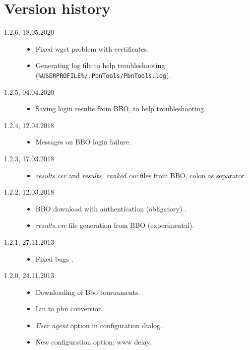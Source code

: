\documentclass[polish,a4paper,11pt,oneside]{article}
\begin{document}
\section{Version history}
\begin{description}
\item[1.2.6, 18.05.2020]
  \begin{itemize}
  \item Fixed wget problem with certificates.
  \item Generating log file to help troubleshooting
        (\verb!%USERPROFILE%/.PbnTools/PbnTools.log!).
  \end{itemize}
\item[1.2.5, 04.04.2020]
  \begin{itemize}
  \item Saving login results from BBO, to help troubleshooting.
  \end{itemize}
\item[1.2.4, 12.04.2018]
  \begin{itemize}
  \item Messages on BBO login failure.
  \end{itemize}
\item[1.2.3, 17.03.2018]
  \begin{itemize}
  \item {\em results.csv} and {\em results\_ranked.csv} files from BBO,
        colon as separator.
  \end{itemize}
\item[1.2.2, 12.03.2018]
  \begin{itemize}
  \item BBO download with authentication (obligatory) .
  \item {\em results.csv} file generation from BBO (experimental).
  \end{itemize}
\item[1.2.1, 27.11.2013]
  \begin{itemize}
  \item Fixed bugs \bugsonetwozero.
  \end{itemize}
\item[1.2.0, 24.11.2013]
  \begin{itemize}
  \item Downloading of Bbo tournaments.
  \item Lin to pbn conversion.
  \item {\em User agent} option in configuration dialog.
  \item New configuration option: www delay.

\end{itemize}
\end{description}
\end{document}
